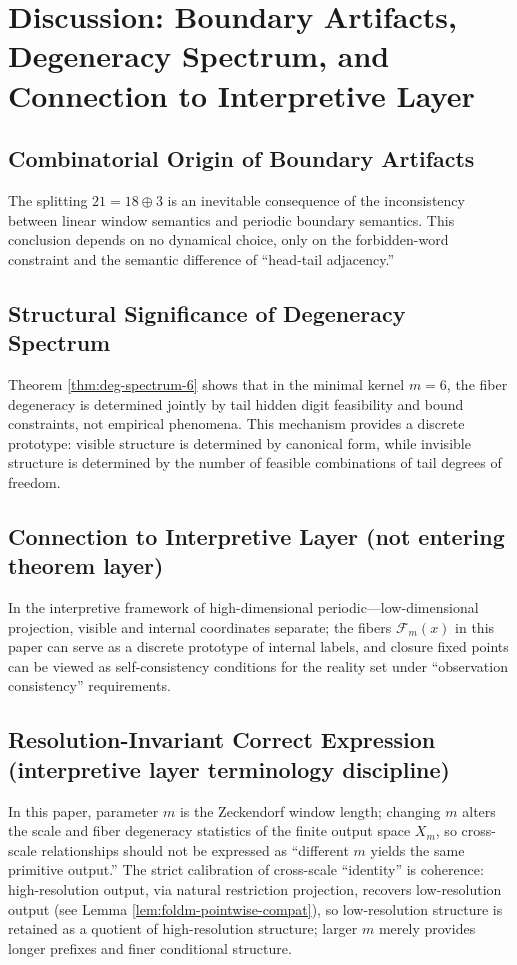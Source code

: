 \section{Discussion: Boundary Artifacts, Degeneracy Spectrum, and Connection to Interpretive Layer}

\subsection{Combinatorial Origin of Boundary Artifacts}

The splitting $21=18\oplus 3$ is an inevitable consequence of the inconsistency between linear window semantics and periodic boundary semantics. This conclusion depends on no dynamical choice, only on the forbidden-word constraint and the semantic difference of ``head-tail adjacency.''

\subsection{Structural Significance of Degeneracy Spectrum}

Theorem \ref{thm:deg-spectrum-6} shows that in the minimal kernel $m=6$, the fiber degeneracy is determined jointly by tail hidden digit feasibility and bound constraints, not empirical phenomena. This mechanism provides a discrete prototype: visible structure is determined by canonical form, while invisible structure is determined by the number of feasible combinations of tail degrees of freedom.

\subsection{Connection to Interpretive Layer (not entering theorem layer)}

In the interpretive framework of high-dimensional periodic—low-dimensional projection, visible and internal coordinates separate; the fibers $\mathcal{F}_m(x)$ in this paper can serve as a discrete prototype of internal labels, and closure fixed points can be viewed as self-consistency conditions for the reality set under ``observation consistency'' requirements.

\subsection{Resolution-Invariant Correct Expression (interpretive layer terminology discipline)}

In this paper, parameter $m$ is the Zeckendorf window length; changing $m$ alters the scale and fiber degeneracy statistics of the finite output space $X_m$, so cross-scale relationships should not be expressed as ``different $m$ yields the same primitive output.'' The strict calibration of cross-scale ``identity'' is coherence: high-resolution output, via natural restriction projection, recovers low-resolution output (see Lemma \ref{lem:foldm-pointwise-compat}), so low-resolution structure is retained as a quotient of high-resolution structure; larger $m$ merely provides longer prefixes and finer conditional structure.
